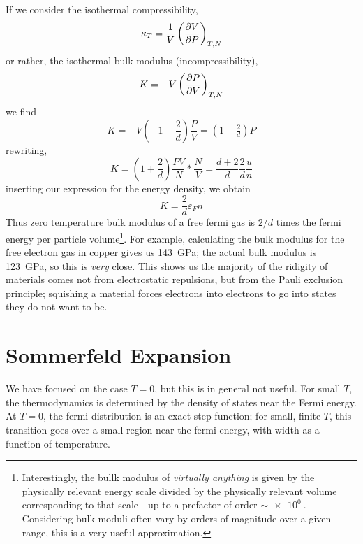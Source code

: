 If we consider the isothermal compressibility,
\[\kappa_T = \frac{1}{V}\left(\frac{\partial V}{\partial P}\right)_{T,N}\]
or rather, the isothermal bulk modulus (incompressibility),
\[K = -V\left(\frac{\partial P}{\partial V}\right)_{T,N}\]
we find
\[K = -V\left(-1-\frac{2}{d}\right)\frac{P}{V} = \left(1+\tfrac{2}{d}\right)P\]
rewriting, 
\[K = \left(1+\frac{2}{d}\right)\frac{PV}{N}*\frac{N}{V} = \frac{d+2}{d}\frac{2}{d}\frac{u}{n}\]
inserting our expression for the energy density, we obtain
\begin{equation}
	K = \frac{2}{d}\varepsilon_F n
\end{equation}
Thus zero temperature bulk modulus of a free fermi gas is \(2/d\) times the fermi energy per particle volume\footnote{Interestingly, the bullk modulus of \emph{virtually anything} is given by the physically relevant energy scale divided by the physically relevant volume corresponding to that scale---up to a prefactor of order \(\sim \SI{e0}{}\). Considering bulk moduli often vary by orders of magnitude over a given range, this is a very useful approximation.}. For example, calculating the bulk modulus for the free electron gas in copper gives us \SI{143}{GPa}; the actual bulk modulus is \SI{123}{GPa}, so this is \emph{very} close. This shows us the majority of the ridigity of materials comes not from electrostatic repulsions, but from the Pauli exclusion principle; squishing a material forces electrons into electrons to go into states they do not want to be.

\section{Sommerfeld Expansion}
We have focused on the case \(T=0\), but this is in general not useful. For small \(T\), the thermodynamics is determined by the density of states near the Fermi energy. At \(T=0\), the fermi distribution is an exact step function; for small, finite \(T\), this transition goes over a small region near the fermi energy, with width as a function of temperature.

